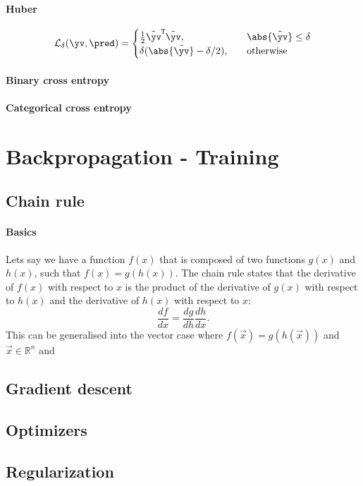         \paragraph{Huber}
            \begin{equation}
                \mathcal{L}_\delta(\yv, \pred) = 
                \begin{cases}
                    \frac{1}{2}\tilde{\yv}^\mathtt{T}\tilde{\yv}, \quad & \abs{\tilde{\yv}}\leq\delta \\
                    \delta(\abs{\tilde{\yv}} - \delta/2), \quad & \mathrm{otherwise}
                \end{cases}
            \end{equation}

        \paragraph{Binary cross entropy}

        \paragraph{Categorical cross entropy}

\section{Backpropagation - Training}
    \subsection{Chain rule}
        \paragraph{Basics}
        Lets say we have a function $f(x)$ that is composed of two functions $g(x)$ and $h(x)$, such that $f(x) = g(h(x))$. The chain rule states that the derivative of $f(x)$ with respect to $x$ is the product of the derivative of $g(x)$ with respect to $h(x)$ and the derivative of $h(x)$ with respect to $x$:
        \begin{equation}
            \frac{df}{dx} = \frac{dg}{dh} \frac{dh}{dx}.
        \end{equation}
        This can be generalised into the vector case where $f(\vec{x}) = g(h(\vec{x}))$ and $\vec{x} \in \mathbb{R}^n$ and 
    \subsection{Gradient descent}
    \subsection{Optimizers}
    \subsection{Regularization} %




